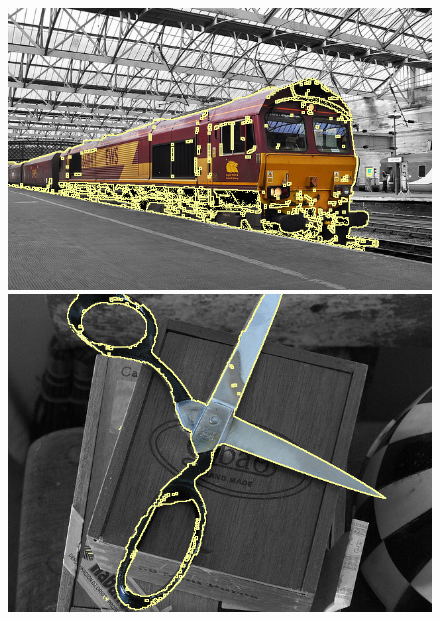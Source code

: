 \documentclass[review]{siamart220329}
\begin{document}
\begin{figure}
{\hspace{0.125em}
\includegraphics[scale=0.13]{figures/coco-experiment/completion/train/gc-seg.png}\hspace{0.125em}
\includegraphics[scale=0.12]{figures/coco-experiment/completion/scissors/gc-seg.png}
}%


\end{figure}
\end{document}

